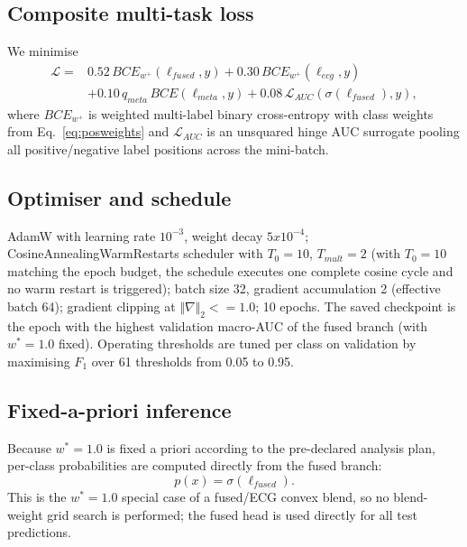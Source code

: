 \documentclass[mathematics,article,pdftex]{Definitions/mdpi}
\def\mathrm#1{#1}%
\def\mathbf#1{#1}%
\def\emph#1{#1}%
\def\bm#1{#1}%
\def\times{x}%
\def\leq{<=}%
\begin{document}
\subsection{Composite multi-task loss}
We minimise
\begin{equation}
\begin{aligned}
\mathcal{L}={}&0.52\,\mathrm{BCE}_{\mathbf{w}^{+}}\!(\bm{\ell}_{\mathrm{fused}},\mathbf{y})
 +0.30\,\mathrm{BCE}_{\mathbf{w}^{+}}\!(\bm{\ell}_{\mathrm{ecg}},\mathbf{y})\\
&+0.10\,q_{\mathrm{meta}}\,\mathrm{BCE}\!(\bm{\ell}_{\mathrm{meta}},\mathbf{y})
 +0.08\,\mathcal{L}_{\mathrm{AUC}}\!(\sigma(\bm{\ell}_{\mathrm{fused}}),\mathbf{y}),
\end{aligned}
\end{equation}
where $\mathrm{BCE}_{\mathbf{w}^{+}}$ is weighted multi-label binary cross-entropy with class weights from Eq.~\eqref{eq:posweights} and $\mathcal{L}_{\mathrm{AUC}}$ is an unsquared hinge AUC surrogate pooling all positive/negative label positions across the mini-batch.

\subsection{Optimiser and schedule}
AdamW with learning rate $10^{-3}$, weight decay $5{\times}10^{-4}$; CosineAnnealingWarmRestarts scheduler with $T_0{=}10$, $T_{\mathrm{mult}}{=}2$ (with $T_0{=}10$ matching the epoch budget, the schedule executes one complete cosine cycle and no warm restart is triggered); batch size 32, gradient accumulation 2 (effective batch 64); gradient clipping at $\Vert\nabla\Vert_{2}{\leq}1.0$; 10 epochs. The saved checkpoint is the epoch with the highest validation macro-AUC of the fused branch (with $w^{\ast}{=}1.0$ fixed). Operating thresholds are tuned per class on validation by maximising $F_{1}$ over 61 thresholds from 0.05 to 0.95.

\subsection{Fixed-a-priori inference}
Because $w^{\ast}{=}1.0$ is fixed \emph{a priori} according to the pre-declared analysis plan, per-class probabilities are computed directly from the fused branch:
\begin{equation}
\mathbf{p}(\mathbf{x}) = \sigma(\bm{\ell}_{\mathrm{fused}}).
\end{equation}
This is the $w^{\ast}{=}1.0$ special case of a fused/ECG convex blend, so no blend-weight grid search is performed; the fused head is used directly for all test predictions.
\end{document}

